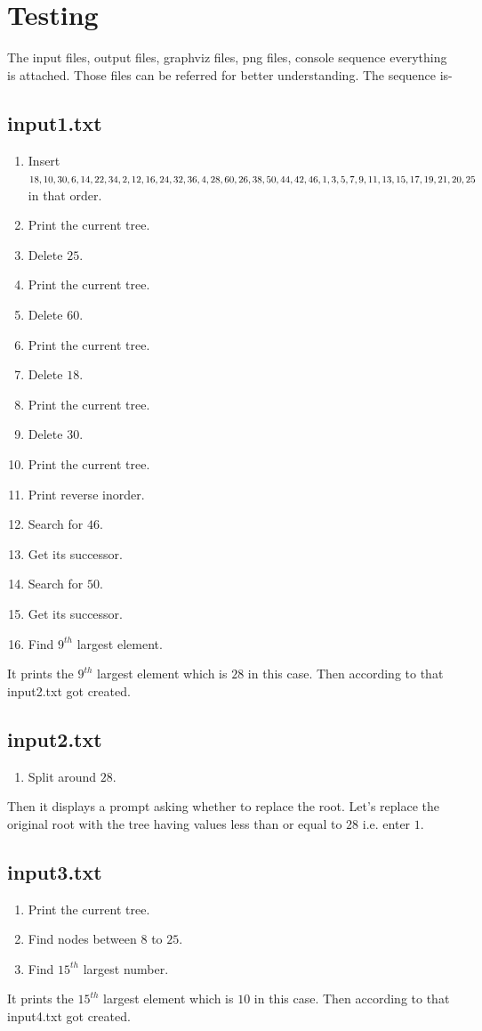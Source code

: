 \documentclass{article}
\begin{document}
\section{Testing}
The input files, output files, graphviz files, png files, console sequence everything is attached.
Those files can be referred for better understanding.
The sequence is-\newline
\subsection{input1.txt}
\begin{enumerate}
	\item Insert $18, 10, 30, 6, 14, 22, 34, 2, 12, 16, 24, 32, 36, 4, 28,\\ 60, 26, 38, 50, 44, 42, 46, 1, 3, 5, 7, 9, 11, 13, 15, 17, 19, 21, 20, 25$ in that order.
	\item Print the current tree.
	\item Delete $25$.
	\item Print the current tree.
	\item Delete $60$.
	\item Print the current tree.
	\item Delete $18$.
	\item Print the current tree.
	\item Delete $30$.
	\item Print the current tree.
	\item Print reverse inorder.
	\item Search for $46$.
	\item Get its successor.
	\item Search for $50$.
	\item Get its successor.
	\item Find $9^{th}$ largest element.
\end{enumerate}
It prints the $9^{th}$ largest element which is $28$ in this case. Then according to that input2.txt got created.
\subsection{input2.txt}
\begin{enumerate}
	\item Split around $28$.
\end{enumerate}
Then it displays a prompt asking whether to replace the root. Let's replace the original root with the tree having values less than or equal to $28$ i.e. enter $1$.
\subsection{input3.txt}
\begin{enumerate}
	\item Print the current tree.
	\item Find nodes between $8$ to $25$.
	\item Find $15^{th}$ largest number.
\end{enumerate}
It prints the $15^{th}$ largest element which is $10$ in this case. Then according to that input4.txt got created.
\end{document}
